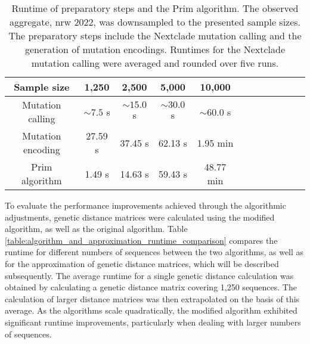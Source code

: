 \begin{table}[ht!]    
\caption[Runtime of preparatory steps and the Prim algorithm]{Runtime of preparatory steps and the Prim algorithm. The observed aggregate, nrw 2022, was downsampled to the presented sample sizes. The preparatory steps include the Nextclade mutation calling and the generation of mutation encodings. Runtimes for the Nextclade mutation calling were averaged and rounded over five runs.}
    \centering
    \begin{tabular}{  Sc | Sc  Sc  Sc  Sc  Sc } 
    Sample size & 1,250 & 2,500 & 5,000 & 10,000\\
    \hline\hline
    Mutation calling & $\sim7.5$ s & $\sim15.0$ s & $\sim30.0$ s & $\sim60.0$ s\\
    Mutation encoding & 27.59 s & 37.45 s & 62.13 s & 1.95 min\\
    Prim algorithm&1.49 s&14.63 s&59.43 s& 48.77 min\\
    \end{tabular}
    \label{table:nextclade_runtime_for_aggregate_sizes}
\end{table}

To evaluate the performance improvements achieved through the algorithmic adjustments, genetic distance matrices were calculated using the modified algorithm, as well as the original algorithm. Table \ref{table:algorithm_and_approximation_runtime_comparison} compares the runtime for different numbers of sequences between the two algorithms, as well as for the approximation of genetic distance matrices, which will be described subsequently. The average runtime for a single genetic distance calculation was obtained by calculating a genetic distance matrix covering 1,250 sequences. The calculation of larger distance matrices was then extrapolated on the basis of this average. As the algorithms scale quadratically, the modified algorithm exhibited significant runtime improvements, particularly when dealing with larger numbers of sequences.

